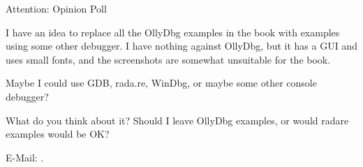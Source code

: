 \bigskip
\bigskip
\bigskip

\huge Attention: Opinion Poll
\normalsize

\bigskip
\bigskip
\bigskip

I have an idea to replace all the OllyDbg examples in the book with examples using some other debugger.
I have nothing against OllyDbg, but it has a GUI and uses small fonts, and the screenshots are somewhat unsuitable for the book.

Maybe I could use GDB, rada.re, WinDbg, or maybe some other console debugger?

What do you think about it?
Should I leave OllyDbg examples, or would radare examples would be OK?

E-Mail: \GTT{\EMAIL}.

\vspace*{\fill}
\vfill
